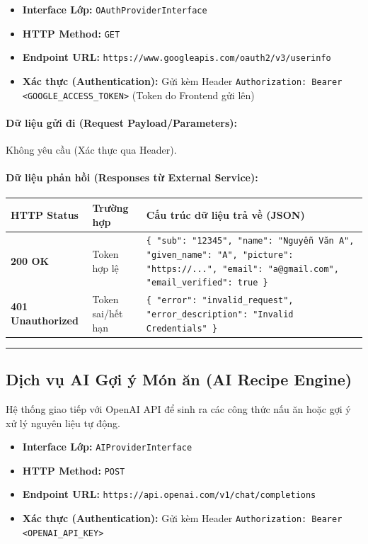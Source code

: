 \documentclass[12pt,a4paper]{article}
\begin{document}
\begin{itemize}[leftmargin=*]
    \item \textbf{Interface Lớp:} \texttt{OAuthProviderInterface}
    \item \textbf{HTTP Method:} \texttt{GET}
    \item \textbf{Endpoint URL:} \texttt{https://www.googleapis.com/oauth2/v3/userinfo}
    \item \textbf{Xác thực (Authentication):} Gửi kèm Header \texttt{Authorization: Bearer \textless{}GOOGLE\_ACCESS\_TOKEN\textgreater{}} (Token do Frontend gửi lên)
\end{itemize}

\paragraph{Dữ liệu gửi đi (Request Payload/Parameters):}
Không yêu cầu (Xác thực qua Header).
\paragraph{Dữ liệu phản hồi (Responses từ External Service):}
\begin{longtable}{|>{\raggedright\arraybackslash}p{2.8cm}|>{\raggedright\arraybackslash}p{3.2cm}|>{\raggedright\arraybackslash}p{8.0cm}|}
\hline
\textbf{HTTP Status} & \textbf{Trường hợp} & \textbf{Cấu trúc dữ liệu trả về (JSON)} \\ \hline
\endhead
\textbf{200 OK} & Token hợp lệ & \texttt{\{ "sub": "12345", "name": "Nguyễn Văn A", "given\_name": "A", "picture": "https://...", "email": "a@gmail.com", "email\_verified": true \}} \\ \hline
\textbf{401 Unauthorized} & Token sai/hết hạn & \texttt{\{ "error": "invalid\_request", "error\_description": "Invalid Credentials" \}} \\ \hline
\end{longtable}

\vskip 0.4cm
\noindent\rule{\textwidth}{0.3pt}
\vskip 0.4cm

\subsection{Dịch vụ AI Gợi ý Món ăn (AI Recipe Engine)}
Hệ thống giao tiếp với OpenAI API để sinh ra các công thức nấu ăn hoặc gợi ý xử lý nguyên liệu tự động.

\begin{itemize}[leftmargin=*]
    \item \textbf{Interface Lớp:} \texttt{AIProviderInterface}
    \item \textbf{HTTP Method:} \texttt{POST}
    \item \textbf{Endpoint URL:} \texttt{https://api.openai.com/v1/chat/completions}
    \item \textbf{Xác thực (Authentication):} Gửi kèm Header \texttt{Authorization: Bearer \textless{}OPENAI\_API\_KEY\textgreater{}}
\end{itemize}
\end{document}
